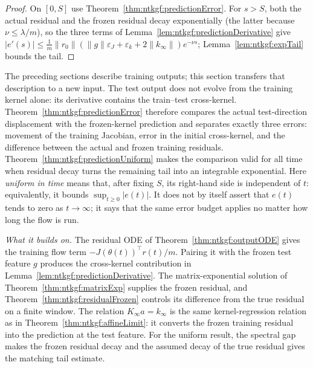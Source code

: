\begin{proof}
  \leanok
On $[0,S]$ use Theorem~\ref{thm:ntkgf:predictionError}. For $s>S$, both the actual residual and the frozen residual decay exponentially (the latter because $\nu\le\lambda/m$), so the three terms of
Lemma~\ref{lem:ntkgf:predictionDerivative} give $|e'(s)|\le\frac1m\|r_0\|(\|g\|\varepsilon_J+\varepsilon_k+2\|k_\infty\|)e^{-\nu s}$; Lemma~\ref{lem:ntkgf:expTail} bounds the tail.
\end{proof}

\begin{remark}
The preceding sections describe training outputs; this section transfers that description to a new
input. The test output does not evolve from the training kernel alone: its derivative contains the
train--test cross-kernel. Theorem~\ref{thm:ntkgf:predictionError} therefore compares the actual
test-direction displacement with the frozen-kernel prediction and separates exactly three errors:
movement of the training Jacobian, error in the initial cross-kernel, and the difference between the
actual and frozen training residuals. Theorem~\ref{thm:ntkgf:predictionUniform} makes the comparison
valid for all time when residual decay turns the remaining tail into an integrable exponential.
Here \emph{uniform in time} means that, after fixing $S$, its right-hand side is independent of
$t$: equivalently, it bounds $\sup_{t\ge0}|e(t)|$. It does not by itself assert that $e(t)$ tends
to zero as $t\to\infty$; it says that the same error budget applies no matter how long the flow is
run.

\emph{What it builds on.} The residual ODE of Theorem~\ref{thm:ntkgf:outputODE} gives the training
flow term $-J(\theta(t))^\top r(t)/m$. Pairing it with the frozen test feature $g$ produces the
cross-kernel contribution in Lemma~\ref{lem:ntkgf:predictionDerivative}. The matrix-exponential
solution of Theorem~\ref{thm:ntkgf:matrixExp} supplies the frozen residual, and
Theorem~\ref{thm:ntkgf:residualFrozen} controls its difference from the true residual on a finite
window. The relation $K_\infty a=k_\infty$ is the same kernel-regression relation as in
Theorem~\ref{thm:ntkgf:affineLimit}: it converts the frozen training residual into the prediction
at the test feature. For the uniform result, the spectral gap makes the frozen residual decay and
the assumed decay of the true residual gives the matching tail estimate.


\end{remark}
